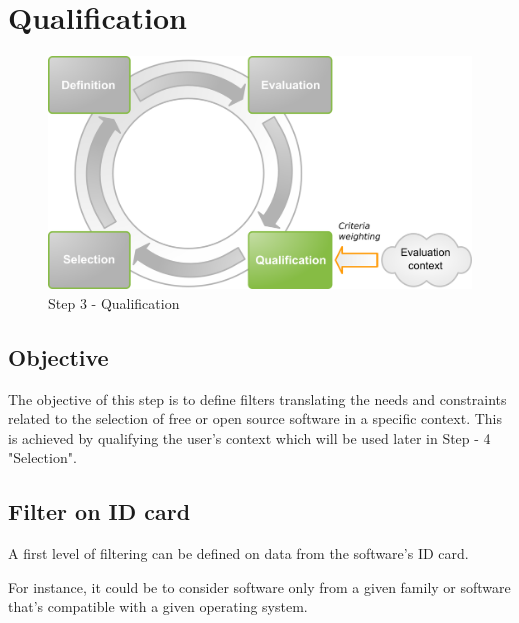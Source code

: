 %
\section{Qualification}
\begin{figure}[h]
\includegraphics[width=13cm]{images/qualifier}
\caption{Step 3 - Qualification}
\end{figure}

\subsection{Objective}
The objective of this step is to define filters translating the needs and constraints 
related to the selection of free or open source software in a specific context. 
This is achieved by qualifying the user's context which will be used later in Step - 4 "Selection".


\subsection{Filter on ID card}
A first level of filtering can be defined on data from the software's ID card.


For instance, it could be to consider software only from a given family or 
software that's compatible with a given operating system.


